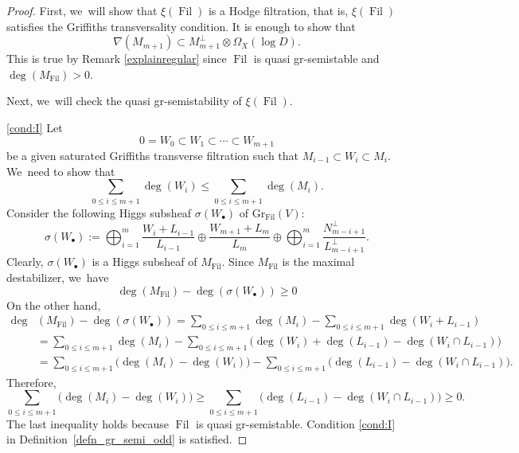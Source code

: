 \documentclass[11pt]{article}
\numberwithin{equation}{section}
\newcommand{\sbullet}{{\scriptscriptstyle\bullet}}
\newcommand{\grsemistable}{gr\nobreakdash-semi\-stable\xspace}
\DeclareMathOperator{\Filt}{Fil}
\newcommand{\Gr}{\mathrm{Gr}}
\theoremstyle{plain}
\theoremstyle{definition}
\begin{document}
\begin{proof}
First, we~will show that $\xi(\Filt)$ is a Hodge filtration, that is, $\xi(\Filt)$ satisfies the Griffiths transversality condition. It is enough to show that
\[
\nabla(M_{m+1})\subset M_{m+1}^\perp\otimes\Omega_X(\log D).
\]
This is true by Remark \ref{explainregular} since $\Filt$ is quasi \grsemistable and $\deg(M_{\Filt})>0$.

Next, we~will check the quasi gr-semistability of $\xi(\Filt)$.

\eqref{cond:I}
Let
\[
0=W_0\subset W_1 \subset \cdots\subset W_{m+1}
\]
be a given saturated Griffiths transverse filtration such that $M_{i-1}\subset W_i\subset M_i$. We~need to show that
\[
\sum_{0\leq i\leq m+1}\deg(W_i)\leqslant\sum_{0\leq i\leq m+1}\deg(M_i).
\]
Consider the following Higgs subsheaf $\sigma(W_\sbullet)$ of $\Gr_{\Filt}(V)$:
\[
\sigma(W_\sbullet):=\mathop{\bigoplus}_{i=1}^{m} \frac{W_i+L_{i-1}}{L_{i-1}}\oplus\frac{W_{m+1}+L_m}{L_m} \oplus \mathop{\bigoplus}_{i=1}^{m} \frac{N_{m-i+1}^\perp}{L_{m-i+1}^\perp}.
\]
Clearly, $\sigma(W_\sbullet)$ is a Higgs subsheaf of $M_{\Filt}$. Since $M_{\Filt}$ is the maximal destabilizer, we~have
\begin{equation}
\deg(M_{\Filt})-\deg(\sigma(W_\sbullet))\geq 0
\end{equation}
On the other hand,
\begin{align*}
\deg&(M_{\Filt})-\deg(\sigma(W_\sbullet))=\sum_{0\leq i\leq m+1}\deg(M_i)-\sum_{0\leq i\leq m+1}\deg(W_i+L_{i-1})\\
&=\sum_{0\leq i\leq m+1}\deg(M_i)-\sum_{0\leq i\leq m+1}\big(\deg(W_i)+\deg(L_{i-1})-\deg(W_i\cap L_{i-1})\big)\\
&=\sum_{0\leq i\leq m+1}\big(\deg(M_i)-\deg(W_i)\big)-\sum_{0\leq i\leq m+1}\big(\deg(L_{i-1})-\deg(W_i\cap L_{i-1})\big).
\end{align*}
Therefore,
\begin{equation}\label{increasing}
\sum_{0\leq i\leq m+1}\big(\deg(M_i)-\deg(W_i)\big)\geq \sum_{0\leq i\leq m+1}\big(\deg(L_{i-1})-\deg(W_i\cap L_{i-1})\big)\geq 0.
\end{equation}
The last inequality holds because $\Filt$ is quasi \grsemistable. Condition \eqref{cond:I} in Definition~\ref{defn_gr_semi_odd} is satisfied.


\end{proof}
\end{document}
